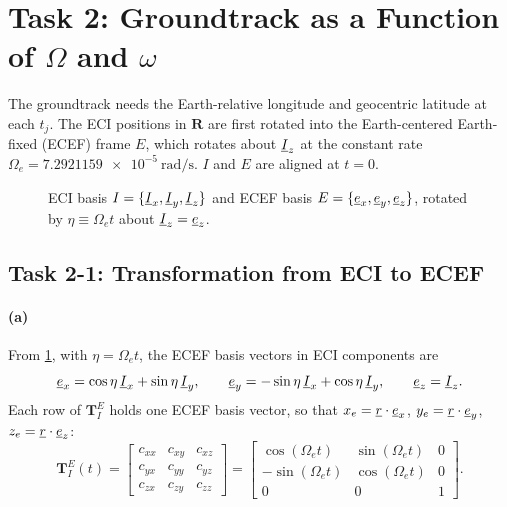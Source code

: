 \section{Task 2: Groundtrack as a Function of \texorpdfstring{$\Omega$}{Omega} and \texorpdfstring{$\omega$}{omega}}
\label{sec:task2}

The groundtrack needs the Earth-relative longitude and geocentric latitude at each $t_j$. The ECI positions in $\mathbf{R}$ are first rotated into the Earth-centered Earth-fixed (ECEF) frame $E$, which rotates about $\underline{I}_z$ at the constant rate $\Omega_e = \SI{7.2921159e-5}{\radian\per\second}$. $I$ and $E$ are aligned at $t=0$.

\begin{figure}[H]
\centering

\caption{ECI basis $I = \{\underline{I}_x,\underline{I}_y,\underline{I}_z\}$ and ECEF basis $E = \{\underline{e}_x,\underline{e}_y,\underline{e}_z\}$, rotated by $\eta \equiv \Omega_e t$ about $\underline{I}_z = \underline{e}_z$.}
\label{fig:t2-frames}
\end{figure}

\subsection*{Task 2-1: Transformation from ECI to ECEF}

\paragraph{(a)} From \cref{fig:t2-frames}, with $\eta = \Omega_e t$, the ECEF basis vectors in ECI components are
\begin{equation}
\underline{e}_x = \cos\eta\,\underline{I}_x + \sin\eta\,\underline{I}_y,
\qquad
\underline{e}_y = -\sin\eta\,\underline{I}_x + \cos\eta\,\underline{I}_y,
\qquad
\underline{e}_z = \underline{I}_z.
\end{equation}
Each row of $\mathbf{T}_I^E$ holds one ECEF basis vector, so that $x_e = \underline{r}\cdot\underline{e}_x$, $y_e = \underline{r}\cdot\underline{e}_y$, $z_e = \underline{r}\cdot\underline{e}_z$:
\begin{equation}
\boxed{\mathbf{T}_I^E(t) =
\begin{bmatrix} c_{xx} & c_{xy} & c_{xz} \\ c_{yx} & c_{yy} & c_{yz} \\ c_{zx} & c_{zy} & c_{zz} \end{bmatrix}
=
\begin{bmatrix} \cos(\Omega_e t) & \sin(\Omega_e t) & 0 \\ -\sin(\Omega_e t) & \cos(\Omega_e t) & 0 \\ 0 & 0 & 1 \end{bmatrix}}.
\label{eq:t2-dcm}
\end{equation}

